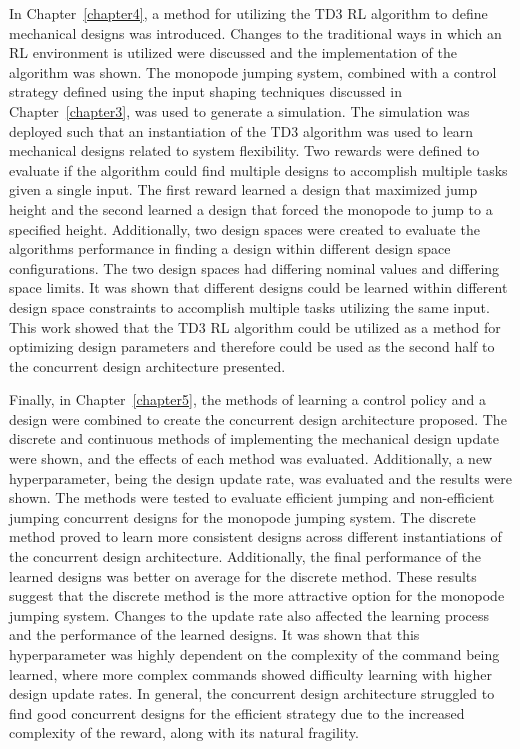 In Chapter~\ref{chapter4}, a method for utilizing the TD3 RL algorithm to define mechanical designs was introduced. Changes to the traditional ways in which an RL environment is utilized were discussed and the implementation of the algorithm was shown. The monopode jumping system, combined with a control strategy defined using the input shaping techniques discussed in Chapter~\ref{chapter3}, was used to generate a simulation. The simulation was deployed such that an instantiation of the TD3 algorithm was used to learn mechanical designs related to system flexibility. Two rewards were defined to evaluate if the algorithm could find multiple designs to accomplish multiple tasks given a single input. The first reward learned a design that maximized jump height and the second learned a design that forced the monopode to jump to a specified height. Additionally, two design spaces were created to evaluate the algorithms performance in finding a design within different design space configurations. The two design spaces had differing nominal values and differing space limits. It was shown that different designs could be learned within different design space constraints to accomplish multiple tasks utilizing the same input. This work showed that the TD3 RL algorithm could be utilized as a method for optimizing design parameters and therefore could be used as the second half to the concurrent design architecture presented.

Finally, in Chapter~\ref{chapter5}, the methods of learning a control policy and a design were combined to create the concurrent design architecture proposed. The discrete and continuous methods of implementing the mechanical design update were shown, and the effects of each method was evaluated. Additionally, a new hyperparameter, being the design update rate, was evaluated and the results were shown. The methods were tested to evaluate efficient jumping and non-efficient jumping concurrent designs for the monopode jumping system. The discrete method proved to learn more consistent designs across different instantiations of the concurrent design architecture. Additionally, the final performance of the learned designs was better on average for the discrete method. These results suggest that the discrete method is the more attractive option for the monopode jumping system. Changes to the update rate also affected the learning process and the performance of the learned designs. It was shown that this hyperparameter was highly dependent on the complexity of the command being learned, where more complex commands showed difficulty learning with higher design update rates. In general, the concurrent design architecture struggled to find good concurrent designs for the efficient strategy due to the increased complexity of the reward, along with its natural fragility. 

